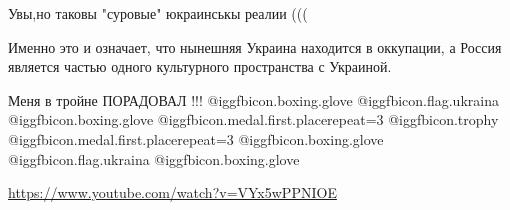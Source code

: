 \begin{itemize}
\begin{itemize}
\end{itemize} %

Увы,но таковы "суровые" юкраинськы реалии (((

Именно это и означает, что нынешняя Украина находится в оккупации, а Россия
является частью одного культурного пространства с Украиной.

Меня в тройне ПОРАДОВАЛ !!!
 @igg{fbicon.boxing.glove} @igg{fbicon.flag.ukraina} @igg{fbicon.boxing.glove}  @igg{fbicon.medal.first.place}{repeat=3}  @igg{fbicon.trophy}  @igg{fbicon.medal.first.place}{repeat=3}  @igg{fbicon.boxing.glove} @igg{fbicon.flag.ukraina} @igg{fbicon.boxing.glove} 

\url{https://www.youtube.com/watch?v=VYx5wPPNIOE}


\end{itemize} %
